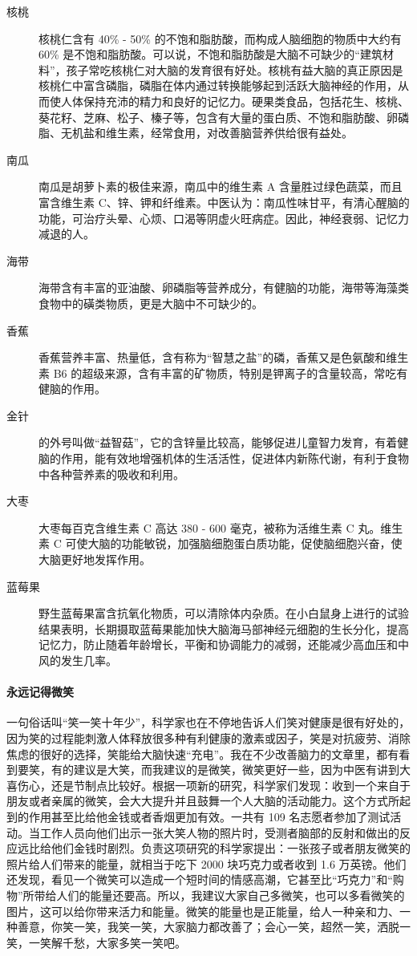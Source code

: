 \documentclass{ctexart}
\begin{document}
\begin{description}
    \item[核桃] 核桃仁含有 40\% - 50\% 的不饱和脂肪酸，而构成人脑细胞的物质中大约有 60\% 是不饱和脂肪酸。可以说，不饱和脂肪酸是大脑不可缺少的“建筑材料”，孩子常吃核桃仁对大脑的发育很有好处。核桃有益大脑的真正原因是核桃仁中富含磷脂，磷脂在体内通过转换能够起到活跃大脑神经的作用，从而使人体保持充沛的精力和良好的记忆力。硬果类食品，包括花生、核桃、葵花籽、芝麻、松子、榛子等，包含有大量的蛋白质、不饱和脂肪酸、卵磷脂、无机盐和维生素，经常食用，对改善脑营养供给很有益处。
    \item[南瓜] 南瓜是胡萝卜素的极佳来源，南瓜中的维生素 A 含量胜过绿色蔬菜，而且富含维生素 C、锌、钾和纤维素。中医认为：南瓜性味甘平，有清心醒脑的功能，可治疗头晕、心烦、口渴等阴虚火旺病症。因此，神经衰弱、记忆力减退的人。
    \item[海带] 海带含有丰富的亚油酸、卵磷脂等营养成分，有健脑的功能，海带等海藻类食物中的磺类物质，更是大脑中不可缺少的。
    \item[香蕉] 香蕉营养丰富、热量低，含有称为“智慧之盐”的磷，香蕉又是色氨酸和维生素 B6 的超级来源，含有丰富的矿物质，特别是钾离子的含量较高，常吃有健脑的作用。
    \item[金针] 的外号叫做“益智菇”，它的含锌量比较高，能够促进儿童智力发育，有着健脑的作用，能有效地增强机体的生活活性，促进体内新陈代谢，有利于食物中各种营养素的吸收和利用。
    \item[大枣] 大枣每百克含维生素 C 高达 380 - 600 毫克，被称为活维生素 C 丸。维生素 C 可使大脑的功能敏锐，加强脑细胞蛋白质功能，促使脑细胞兴奋，使大脑更好地发挥作用。
    \item[蓝莓果] 野生蓝莓果富含抗氧化物质，可以清除体内杂质。在小白鼠身上进行的试验结果表明，长期摄取蓝莓果能加快大脑海马部神经元细胞的生长分化，提高记忆力，防止随着年龄增长，平衡和协调能力的减弱，还能减少高血压和中风的发生几率。
\end{description}

\paragraph{永远记得微笑} 一句俗话叫“笑一笑十年少”，科学家也在不停地告诉人们笑对健康是很有好处的，因为笑的过程能刺激人体释放很多种有利健康的激素或因子，笑是对抗疲劳、消除焦虑的很好的选择，笑能给大脑快速“充电”。我在不少改善脑力的文章里，都有看到要笑，有的建议是大笑，而我建议的是微笑，微笑更好一些，因为中医有讲到大喜伤心，还是节制点比较好。根据一项新的研究，科学家们发现：收到一个来自于朋友或者亲属的微笑，会大大提升并且鼓舞一个人大脑的活动能力。这个方式所起到的作用甚至比给他金钱或者香烟更加有效。一共有 109 名志愿者参加了测试活动。当工作人员向他们出示一张大笑人物的照片时，受测者脑部的反射和做出的反应远比给他们金钱时剧烈。负责这项研究的科学家提出：一张孩子或者朋友微笑的照片给人们带来的能量，就相当于吃下 2000 块巧克力或者收到 1.6 万英镑。他们还发现，看见一个微笑可以造成一个短时间的情感高潮，它甚至比“巧克力”和“购物”所带给人们的能量还要高。所以，我建议大家自己多微笑，也可以多看微笑的图片，这可以给你带来活力和能量。微笑的能量也是正能量，给人一种亲和力、一种善意，你笑一笑，我笑一笑，大家脑力都改善了；会心一笑，超然一笑，洒脱一笑，一笑解千愁，大家多笑一笑吧。
\end{document}
